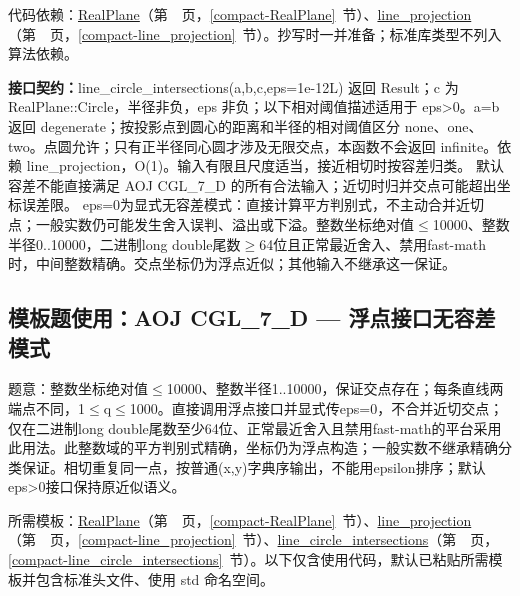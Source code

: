 代码依赖：\hyperref[compact-RealPlane]{RealPlane}（第~\pageref{compact-RealPlane}~页，\ref{compact-RealPlane}~节）、\hyperref[compact-line_projection]{line\_\allowbreak{}projection}（第~\pageref{compact-line_projection}~页，\ref{compact-line_projection}~节）。抄写时一并准备；标准库类型不列入算法依赖。

{\sloppy{}\noindent\textbf{接口契约：}line\_circle\_intersections(a,b,c,eps=1e-12L) 返回 Result；c 为 RealPlane::Circle，半径非负，eps 非负；以下相对阈值描述适用于 eps>0。a=b 返回 degenerate；按投影点到圆心的距离和半径的相对阈值区分 none、one、two。点圆允许；只有正半径同心圆才涉及无限交点，本函数不会返回 infinite。依赖 line\_projection，O(1)。输入有限且尺度适当，接近相切时按容差归类。 默认容差不能直接满足 AOJ CGL\_7\_D 的所有合法输入；近切时归并交点可能超出坐标误差限。 eps=0为显式无容差模式：直接计算平方判别式，不主动合并近切点；一般实数仍可能发生舍入误判、溢出或下溢。整数坐标绝对值$\le$10000、整数半径0..10000，二进制long double尾数$\ge$64位且正常最近舍入、禁用fast-math时，中间整数精确。交点坐标仍为浮点近似；其他输入不继承这一保证。\par}



\Needspace{510pt}

\subsection*{模板题使用：AOJ CGL\_7\_D — 浮点接口无容差模式}

\label{usage-example-229}

题意：整数坐标绝对值$\le$10000、整数半径1..10000，保证交点存在；每条直线两端点不同，1$\le$q$\le$1000。直接调用浮点接口并显式传eps=0，不合并近切交点；仅在二进制long double尾数至少64位、正常最近舍入且禁用fast-math的平台采用此用法。此整数域的平方判别式精确，坐标仍为浮点构造；一般实数不继承精确分类保证。相切重复同一点，按普通(x,y)字典序输出，不能用epsilon排序；默认eps>0接口保持原近似语义。

所需模板：\hyperref[compact-RealPlane]{RealPlane}（第~\pageref{compact-RealPlane}~页，\ref{compact-RealPlane}~节）、\hyperref[compact-line_projection]{line\_\allowbreak{}projection}（第~\pageref{compact-line_projection}~页，\ref{compact-line_projection}~节）、\hyperref[compact-line_circle_intersections]{line\_\allowbreak{}circle\_\allowbreak{}intersections}（第~\pageref{compact-line_circle_intersections}~页，\ref{compact-line_circle_intersections}~节）。以下仅含使用代码，默认已粘贴所需模板并包含标准头文件、使用 std 命名空间。

